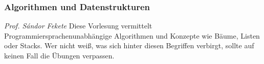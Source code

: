 \subsubsection{Algorithmen und Datenstrukturen}
	\textit{Prof. S\'andor Fekete}
	Diese Vorlesung vermittelt Programmiersprachenunabhängige Algorithmen und Konzepte wie Bäume, Listen oder Stacks. Wer nicht weiß, was sich hinter diesen Begriffen verbirgt, sollte auf keinen Fall die Übungen verpassen.